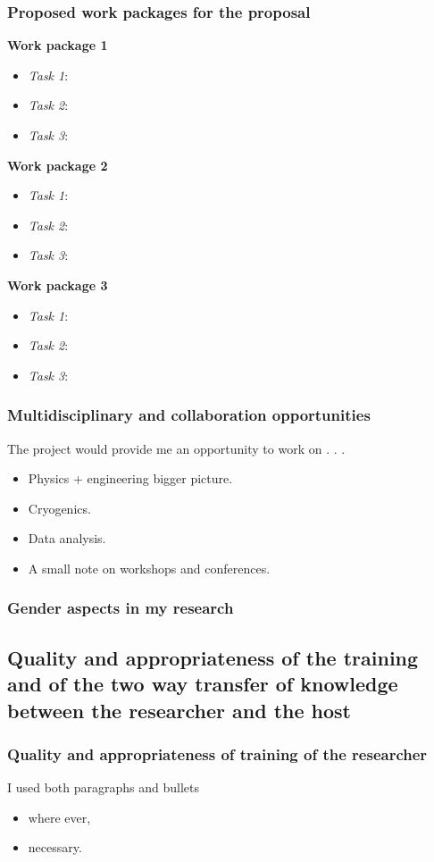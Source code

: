 \documentclass[a4paper,11pt]{extarticle}
\begin{document}
\subsubsection{Proposed work packages for the proposal}
\textbf{Work package 1} 
\begin{itemize}
    \setlength\itemsep{-0.2em}
    \item \textit{Task 1}: 
    \item \textit{Task 2}: 
    \item \textit{Task 3}: 
\end{itemize}
\textbf{Work package 2} 
\begin{itemize}
    \setlength\itemsep{-0.2em}
    \item \textit{Task 1}: 
    \item \textit{Task 2}: 
    \item \textit{Task 3}: 
\end{itemize}
\textbf{Work package 3} 
\begin{itemize}
    \setlength\itemsep{-0.2em}
    \item \textit{Task 1}: 
    \item \textit{Task 2}: 
    \item \textit{Task 3}: 
\end{itemize}
\subsubsection{Multidisciplinary and collaboration opportunities}
The project would provide me an opportunity to work on . . .
\begin{itemize}
\setlength\itemsep{-0.2em}
    \item Physics + engineering bigger picture.
    \item Cryogenics.
    \item Data analysis. 
    \item A small note on workshops and conferences.
\end{itemize}
\subsubsection{Gender aspects in my research}
\subsection{Quality and appropriateness of the training and of the two way transfer of knowledge between the researcher and the host}
\subsubsection{Quality and appropriateness of training of the researcher}
I used both paragraphs and bullets \begin{itemize}
    \item where ever,
    \item necessary.
\end{itemize}
\end{document}
